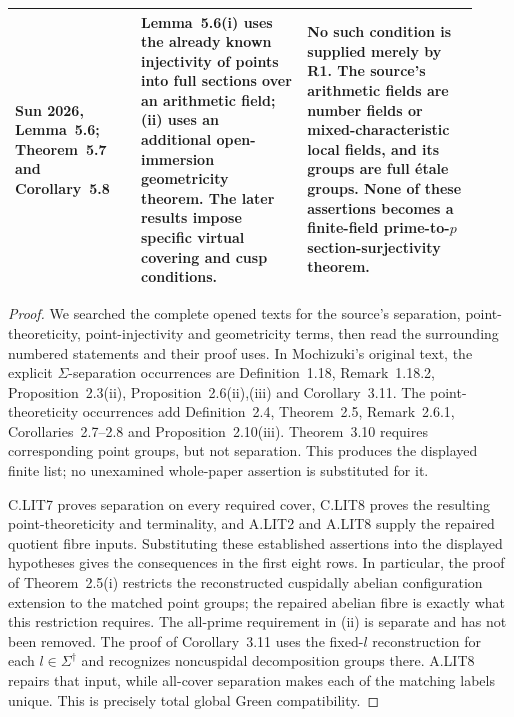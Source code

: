 \begin{center}
\begin{longtable}{p{0.25\linewidth}p{0.33\linewidth}p{0.34\linewidth}}
Sun 2026, Lemma~5.6; Theorem~5.7 and Corollary~5.8&
Lemma~5.6(i) uses the already known injectivity of points into
full sections over an arithmetic field; (ii) uses an additional
open-immersion geometricity theorem. The later results impose
specific virtual covering and cusp conditions.&
No such condition is supplied merely by R1. The source's
arithmetic fields are number fields or mixed-characteristic
local fields, and its groups are full \'etale groups.
None of these assertions becomes a finite-field prime-to-$p$
section-surjectivity theorem.\\
\bottomrule
\end{longtable}
\end{center}
\begin{proof}
We searched the complete opened texts for the source's
separation, point-theoreticity, point-injectivity and geometricity
terms, then read the surrounding numbered statements and their
proof uses. In Mochizuki's original text, the explicit
$\Sigma$-separation occurrences are Definition~1.18,
Remark~1.18.2, Proposition~2.3(ii), Proposition~2.6(ii),(iii)
and Corollary~3.11. The point-theoreticity occurrences add
Definition~2.4, Theorem~2.5, Remark~2.6.1, Corollaries~2.7--2.8
and Proposition~2.10(iii). Theorem~3.10 requires corresponding
point groups, but not separation. This produces the displayed
finite list; no unexamined whole-paper assertion is substituted
for it.

C.LIT7 proves separation on every required cover, C.LIT8 proves
the resulting point-theoreticity and terminality, and A.LIT2
and A.LIT8 supply the repaired quotient fibre inputs. Substituting
these established assertions into the displayed hypotheses gives
the consequences in the first eight rows. In particular, the
proof of Theorem~2.5(i) restricts the reconstructed cuspidally
abelian configuration extension to the matched point groups;
the repaired abelian fibre is exactly what this restriction
requires. The all-prime requirement in (ii) is separate and
has not been removed. The proof of Corollary~3.11 uses the
fixed-$l$ reconstruction for each $l\in\Sigma^\dagger$
and recognizes noncuspidal decomposition groups there. A.LIT8
repairs that input, while all-cover separation makes each of
the matching labels unique. This is precisely total global
Green compatibility.


\end{proof}
